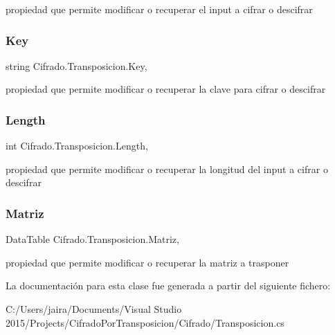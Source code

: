 propiedad que permite modificar o recuperar el input a cifrar o descifrar 

\mbox{\label{class_cifrado_1_1_transposicion_ada94313eb5cb29e6c95ade7bd2f8306f}} 
\subsubsection{\texorpdfstring{Key}{Key}}
{\footnotesize\ttfamily string Cifrado.\+Transposicion.\+Key\hspace{0.3cm}{\ttfamily [get]}, {\ttfamily [set]}}



propiedad que permite modificar o recuperar la clave para cifrar o descifrar 

\mbox{\label{class_cifrado_1_1_transposicion_a732e580b22860879283fd70933821194}} 
\subsubsection{\texorpdfstring{Length}{Length}}
{\footnotesize\ttfamily int Cifrado.\+Transposicion.\+Length\hspace{0.3cm}{\ttfamily [get]}, {\ttfamily [set]}}



propiedad que permite modificar o recuperar la longitud del input a cifrar o descifrar 

\mbox{\label{class_cifrado_1_1_transposicion_a0befab6514e913da972697a59f27b14a}} 
\subsubsection{\texorpdfstring{Matriz}{Matriz}}
{\footnotesize\ttfamily Data\+Table Cifrado.\+Transposicion.\+Matriz\hspace{0.3cm}{\ttfamily [get]}, {\ttfamily [set]}}



propiedad que permite modificar o recuperar la matriz a trasponer 



La documentación para esta clase fue generada a partir del siguiente fichero\+:\begin{DoxyCompactItemize}
\item 
C\+:/\+Users/jaira/\+Documents/\+Visual Studio 2015/\+Projects/\+Cifrado\+Por\+Transposicion/\+Cifrado/Transposicion.\+cs\end{DoxyCompactItemize}
